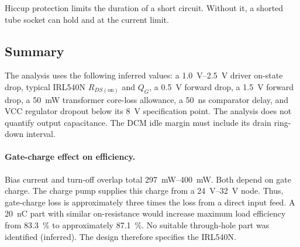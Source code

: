 Hiccup protection limits the duration of a short circuit. Without it, a shorted
tube socket can hold  and  at the current limit.

\subsection{Summary}\label{sec:hv-summary}

The analysis uses the following inferred values: a
\SIrange{1.0}{2.5}{\volt} driver on-state drop, typical IRL540N
$R_{DS(\mathrm{on})}$ and $Q_G$, a \SI{0.5}{\volt}  forward
drop, a \SI{1.5}{\volt}  forward drop, a
\SI{50}{\milli\watt} transformer core-loss allowance, a
\SI{50}{\nano\second} comparator delay, and VCC regulator dropout below its
\SI{8}{\volt} specification point. The analysis does not quantify
 output capacitance. The DCM idle margin must include its drain
ring-down interval.

\paragraph{Gate-charge effect on efficiency.}\label{sec:hv-summary-lever}
Bias current and turn-off overlap total
\SIrange{297}{400}{\milli\watt}. Both depend on  gate charge. The
charge pump supplies this charge from a \SIrange{24}{32}{\volt} node. Thus,
gate-charge loss is approximately three times the loss from a direct input feed.
A \SI{20}{\nano\coulomb} part with similar on-resistance would increase maximum
load efficiency from \SI{83.3}{\percent} to approximately
\SI{87.1}{\percent}. No suitable through-hole part was identified (inferred).
The design therefore specifies the IRL540N.

